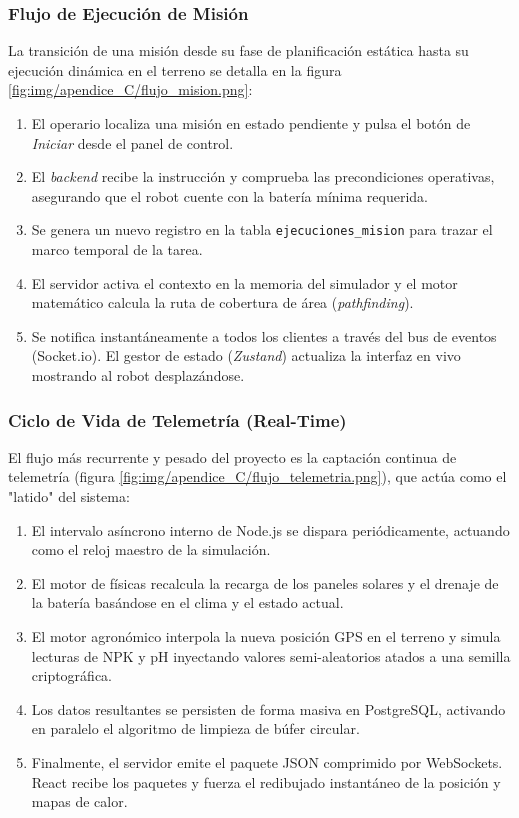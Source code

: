
\subsubsection{Flujo de Ejecución de Misión}
La transición de una misión desde su fase de planificación estática hasta su ejecución dinámica en el terreno se detalla en la figura \ref{fig:img/apendice_C/flujo_mision.png}:
\begin{enumerate}
    \item El operario localiza una misión en estado pendiente y pulsa el botón de \textit{Iniciar} desde el panel de control.
    \item El \textit{backend} recibe la instrucción y comprueba las precondiciones operativas, asegurando que el robot cuente con la batería mínima requerida.
    \item Se genera un nuevo registro en la tabla \texttt{ejecuciones\_mision} para trazar el marco temporal de la tarea.
    \item El servidor activa el contexto en la memoria del simulador y el motor matemático calcula la ruta de cobertura de área (\textit{pathfinding}).
    \item Se notifica instantáneamente a todos los clientes a través del bus de eventos (Socket.io). El gestor de estado (\textit{Zustand}) actualiza la interfaz en vivo mostrando al robot desplazándose.
\end{enumerate}


\subsubsection{Ciclo de Vida de Telemetría (Real-Time)}
El flujo más recurrente y pesado del proyecto es la captación continua de telemetría (figura \ref{fig:img/apendice_C/flujo_telemetria.png}), que actúa como el "latido" del sistema:
\begin{enumerate}
    \item El intervalo asíncrono interno de Node.js se dispara periódicamente, actuando como el reloj maestro de la simulación.
    \item El motor de físicas recalcula la recarga de los paneles solares y el drenaje de la batería basándose en el clima y el estado actual.
    \item El motor agronómico interpola la nueva posición GPS en el terreno y simula lecturas de NPK y pH inyectando valores semi-aleatorios atados a una semilla criptográfica.
    \item Los datos resultantes se persisten de forma masiva en PostgreSQL, activando en paralelo el algoritmo de limpieza de búfer circular.
    \item Finalmente, el servidor emite el paquete JSON comprimido por WebSockets. React recibe los paquetes y fuerza el redibujado instantáneo de la posición y mapas de calor.
\end{enumerate}

